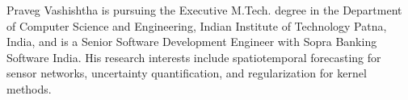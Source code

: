 


\begin{IEEEbiographynophoto}{Praveg Vashishtha}
is pursuing the Executive M.Tech. degree in the Department of Computer Science and Engineering,
Indian Institute of Technology Patna, India, and is a Senior Software Development Engineer with Sopra
Banking Software India. His research interests include spatiotemporal forecasting for sensor
networks, uncertainty quantification, and regularization for kernel methods.
\end{IEEEbiographynophoto}

